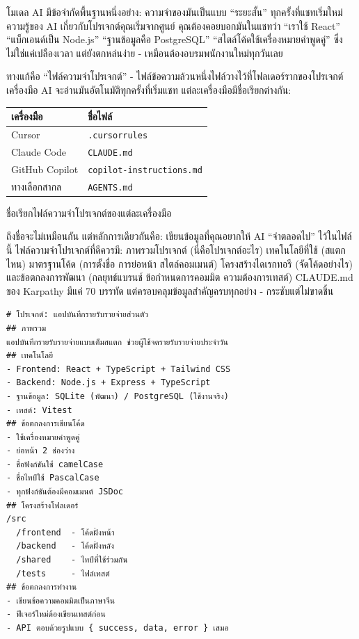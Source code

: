 


โมเดล AI มีข้อจำกัดพื้นฐานหนึ่งอย่าง: ความจำของมันเป็นแบบ “ระยะสั้น” ทุกครั้งที่แชทเริ่มใหม่ ความรู้ของ AI เกี่ยวกับโปรเจกต์คุณเริ่มจากศูนย์ คุณต้องคอยบอกมันในแชทว่า “เราใช้ React” “แบ็กเอนด์เป็น Node.js” “ฐานข้อมูลคือ PostgreSQL” “สไตล์โค้ดใช้เครื่องหมายคำพูดคู่” ซึ่งไม่ใช่แค่เปลืองเวลา แต่ยังตกหล่นง่าย - เหมือนต้องอบรมพนักงานใหม่ทุกวันเลย

ทางแก้คือ “ไฟล์ความจำโปรเจกต์” - ไฟล์ข้อความล้วนหนึ่งไฟล์วางไว้ที่โฟลเดอร์รากของโปรเจกต์ เครื่องมือ AI จะอ่านมันอัตโนมัติทุกครั้งที่เริ่มแชท แต่ละเครื่องมือมีชื่อเรียกต่างกัน:

\begin{center}
\begin{tabularx}{\linewidth}{|X|X|}
\hline
\textbf{เครื่องมือ} & \textbf{ชื่อไฟล์} \tabularnewline
\hline
Cursor & \texttt{.\allowbreak cursorrules} \tabularnewline
Claude Code & \texttt{CLAUDE.\allowbreak md} \tabularnewline
GitHub Copilot & \texttt{copilot-\allowbreak instructions.\allowbreak md} \tabularnewline
ทางเลือกสากล & \texttt{AGENTS.\allowbreak md} \tabularnewline
\hline
\end{tabularx}
\end{center}

\begin{center}\small\color{gray}ชื่อเรียกไฟล์ความจำโปรเจกต์ของแต่ละเครื่องมือ\end{center}

ถึงชื่อจะไม่เหมือนกัน แต่หลักการเดียวกันคือ: เขียนข้อมูลที่คุณอยากให้ AI “จำตลอดไป” ไว้ในไฟล์นี้ ไฟล์ความจำโปรเจกต์ที่ดีควรมี: ภาพรวมโปรเจกต์ (นี่คือโปรเจกต์อะไร) เทคโนโลยีที่ใช้ (สแตกไหน) มาตรฐานโค้ด (การตั้งชื่อ การย่อหน้า สไตล์คอมเมนต์) โครงสร้างไดเรกทอรี (จัดโค้ดอย่างไร) และข้อตกลงการพัฒนา (กลยุทธ์แบรนช์ ข้อกำหนดการคอมมิต ความต้องการเทสต์) CLAUDE.md ของ Karpathy มีแค่ 70 บรรทัด แต่ครอบคลุมข้อมูลสำคัญครบทุกอย่าง - กระชับแต่ไม่ขาดชิ้น

\begin{lstlisting}
# โปรเจกต์: แอปบันทึกรายรับรายจ่ายส่วนตัว
## ภาพรวม
แอปบันทึกรายรับรายจ่ายแบบเต็มสแตก ช่วยผู้ใช้จดรายรับรายจ่ายประจำวัน
## เทคโนโลยี
- Frontend: React + TypeScript + Tailwind CSS
- Backend: Node.js + Express + TypeScript
- ฐานข้อมูล: SQLite (พัฒนา) / PostgreSQL (ใช้งานจริง)
- เทสต์: Vitest
## ข้อตกลงการเขียนโค้ด
- ใช้เครื่องหมายคำพูดคู่
- ย่อหน้า 2 ช่องว่าง
- ชื่อฟังก์ชันใช้ camelCase
- ชื่อไทป์ใช้ PascalCase
- ทุกฟังก์ชันต้องมีคอมเมนต์ JSDoc
## โครงสร้างโฟลเดอร์
/src
  /frontend  - โค้ดฝั่งหน้า
  /backend   - โค้ดฝั่งหลัง
  /shared    - ไทป์ที่ใช้ร่วมกัน
  /tests     - ไฟล์เทสต์
## ข้อตกลงการทำงาน
- เขียนข้อความคอมมิตเป็นภาษาจีน
- ฟีเจอร์ใหม่ต้องเขียนเทสต์ก่อน
- API ตอบด้วยรูปแบบ { success, data, error } เสมอ
\end{lstlisting}

